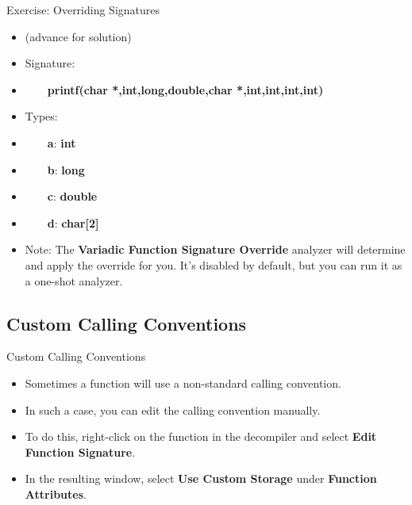 \documentclass{beamer}
\begin{document}
\begin{frame}
\begin{block}{Exercise: Overriding Signatures}
\begin{itemize}
\item[] (advance for solution)
\pause
\item Signature:
\item[] ~~~~\textbf{printf(char *,int,long,double,char *,int,int,int,int)}
\item Types:
\item[] ~~~~\textbf{a}: \textbf{int}
\item[] ~~~~\textbf{b}: \textbf{long}
\item[] ~~~~\textbf{c}: \textbf{double}
\item[] ~~~~\textbf{d}: \textbf{char[2] }
\item Note: The \textbf{Variadic Function Signature Override} analyzer will determine and apply the override for you.  It's disabled by default, but you can 
run it as a one-shot analyzer.
\end{itemize}
\end{block}
\end{frame}

\subsection{Custom Calling Conventions}
\begin{frame}
\begin{block}{Custom Calling Conventions}
\begin{itemize}
\item Sometimes a function will use a non-standard calling convention.
\item In such a case, you can edit the calling convention manually.
\item To do this, right-click on the function in the decompiler and select \textbf{Edit Function Signature}.
\item In the resulting window, select \textbf{Use Custom Storage} under \textbf{Function Attributes}.
\end{itemize}
\end{block}
\end{frame}
\end{document}
